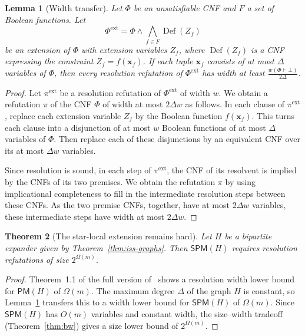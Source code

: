 \documentclass[11pt]{article}
\newtheorem{theorem}{Theorem}[section]
\newtheorem{lemma}[theorem]{Lemma}
\theoremstyle{definition}
\theoremstyle{remark}
\newcommand{\PM}{\mathsf{PM}}
\newcommand{\SPM}{\mathsf{SPM}}
\newcommand{\vv}[1]{\mathbf{#1}}
\begin{document}
\begin{lemma}[Width transfer]
\label{lem:width-transfer}
Let $\Phi$ be an unsatisfiable CNF and $F$ a set of Boolean functions. Let
\[
\Phi^{\mathrm{ext}}=\Phi\wedge\bigwedge_{f \in F}\operatorname{Def}(Z_f)
\]
be an extension of $\Phi$ with extension variables $Z_f$, where $\operatorname{Def}(Z_f)$ is a CNF expressing the constraint $Z_f=f(\vv{x}_f)$. If each tuple $\vv{x}_f$ consists of at most $\Delta$ variables of $\Phi$, then every resolution refutation of $\Phi^{\mathrm{ext}}$ has width at least $\frac{w(\Phi\vdash\bot)}{2\Delta}$.
\end{lemma}

\begin{proof}
Let $\pi^{\mathrm{ext}}$ be a resolution refutation of $\Phi^{\mathrm{ext}}$ of width $w$. We obtain a refutation $\pi$ of the CNF $\Phi$ of width at most $2\Delta w$ as follows. In each clause of $\pi^{\mathrm{ext}}$, replace each extension variable $Z_f$ by the Boolean function $f(\vv{x}_f)$. This turns each clause into a disjunction of at most $w$ Boolean functions of at most $\Delta$ variables of $\Phi$. Then replace each of these disjunctions by an equivalent CNF over its at most $\Delta w$ variables.

Since resolution is sound, in each step of $\pi^{\mathrm{ext}}$, the CNF of its resolvent is implied by the CNFs of its two premises. We obtain the refutation $\pi$ by using implicational completeness to fill in the intermediate resolution steps between these CNFs. As the two premise CNFs, together, have at most $2\Delta w$ variables, these intermediate steps have width at most $2\Delta w$.
\end{proof}

\begin{theorem}[The star-local extension remains hard]
\label{thm:star-local-hard}
Let $H$ be a bipartite expander given by Theorem~\ref{thm:iss-graphs}. Then $\SPM(H)$ requires resolution refutations of size $2^{\Omega(m)}$.
\end{theorem}

\begin{proof}
Theorem~1.1 of the full version of~\cite{iss} shows a resolution width lower bound for $\PM(H)$ of $\Omega(m)$. The maximum degree $\Delta$ of the graph $H$ is constant, so Lemma~\ref{lem:width-transfer} transfers this to a width lower bound for $\SPM(H)$ of $\Omega(m)$.
Since $\SPM(H)$ has $O(m)$ variables and constant width, the size--width tradeoff (Theorem~\ref{thm:bw}) gives a size lower bound of $2^{\Omega(m)}$.
\end{proof}
\end{document}
